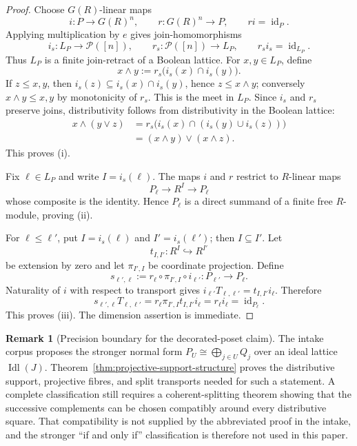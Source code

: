 \documentclass[11pt]{amsart}
\numberwithin{equation}{section}
\theoremstyle{definition}
\newtheorem{remark}[theorem]{Remark}
\newcommand{\id}{\operatorname{id}}
\begin{document}
\begin{proof}
Choose $G(R)$-linear maps
\[
i:P\longrightarrow G(R)^n,
\qquad
r:G(R)^n\longrightarrow P,
\qquad
r i=\id_P.
\]
Applying multiplication by $e$ gives join-homomorphisms
\[
i_s:L_P\longrightarrow\mathcal P([n]),
\qquad
r_s:\mathcal P([n])\longrightarrow L_P,
\qquad
r_s i_s=\id_{L_P}.
\]
Thus $L_P$ is a finite join-retract of a Boolean lattice.  For
$x,y\in L_P$, define
\[
x\wedge y:=r_s\bigl(i_s(x)\cap i_s(y)\bigr).
\]
If $z\leq x,y$, then $i_s(z)\subseteq i_s(x)\cap i_s(y)$, hence
$z\leq x\wedge y$; conversely $x\wedge y\leq x,y$ by monotonicity of
$r_s$.  This is the meet in $L_P$.  Since $i_s$ and $r_s$ preserve joins,
distributivity follows from distributivity in the Boolean lattice:
\[
\begin{aligned}
x\wedge(y\vee z)
&=r_s\bigl(i_s(x)\cap(i_s(y)\cup i_s(z))\bigr)\\
&=(x\wedge y)\vee(x\wedge z).
\end{aligned}
\]
This proves (i).

Fix $\ell\in L_P$ and write $I=i_s(\ell)$.  The maps $i$ and $r$
restrict to $R$-linear maps
\[
P_\ell\longrightarrow R^I\longrightarrow P_\ell
\]
whose composite is the identity.  Hence $P_\ell$ is a direct summand of a
finite free $R$-module, proving (ii).

For $\ell\leq\ell'$, put $I=i_s(\ell)$ and $I'=i_s(\ell')$; then
$I\subseteq I'$.  Let
\[
t_{I,I'}:R^I\hookrightarrow R^{I'}
\]
be extension by zero and let $\pi_{I',I}$ be coordinate projection.  Define
\[
s_{\ell',\ell}
:=r_\ell\circ\pi_{I',I}\circ i_{\ell'}:P_{\ell'}\to P_\ell.
\]
Naturality of $i$ with respect to transport gives
$i_{\ell'}T_{\ell,\ell'}=t_{I,I'}i_\ell$.  Therefore
\[
s_{\ell',\ell}T_{\ell,\ell'}
=r_\ell\pi_{I',I}t_{I,I'}i_\ell
=r_\ell i_\ell
=\id_{P_\ell}.
\]
This proves (iii).  The dimension assertion is immediate.
\end{proof}

\begin{remark}[Precision boundary for the decorated-poset claim]
\label{rem:projective-classification-boundary}
The intake corpus proposes the stronger normal form
$P_U\cong\bigoplus_{j\in U}Q_j$ over an ideal lattice
$\operatorname{Idl}(J)$.  Theorem~\ref{thm:projective-support-structure}
proves the distributive support, projective fibres, and split transports
needed for such a statement.  A complete classification still requires a
coherent-splitting theorem showing that the successive complements can be
chosen compatibly around every distributive square.  That compatibility is
not supplied by the abbreviated proof in the intake, and the stronger
``if and only if'' classification is therefore not used in this paper.
\end{remark}
\end{document}
